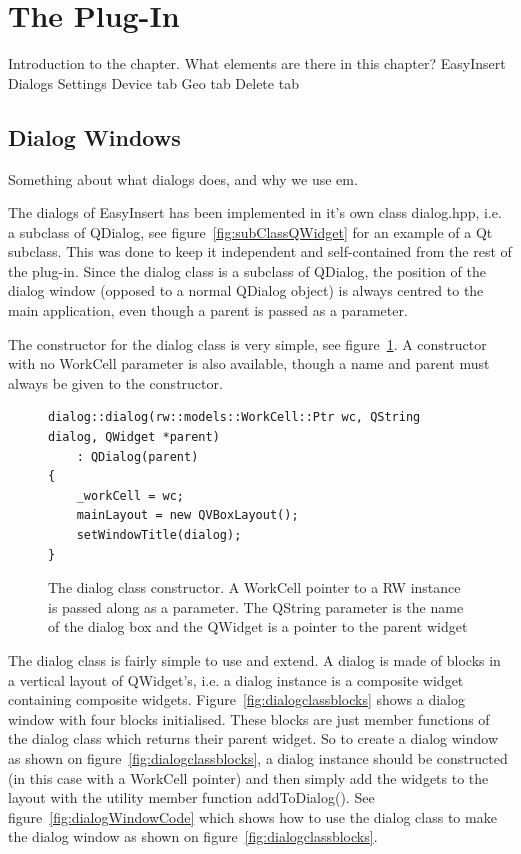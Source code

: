 \section{The Plug-In}
Introduction to the chapter.
	What elements are there in this chapter?		
		EasyInsert
		Dialogs
		Settings		
		Device tab
		Geo tab
		Delete tab


\subsection{Dialog Windows}
Something about what dialogs does, and why we use em.

The dialogs of EasyInsert has been implemented in it's own class dialog.hpp, i.e. a subclass of QDialog, see figure~\ref{fig:subClassQWidget} for an example of a Qt subclass. This was done to keep it independent and self-contained from the rest of the plug-in. Since the dialog class is a subclass of QDialog, the position of the dialog window (opposed to a normal QDialog object) is always centred to the main application, even though a parent is passed as a parameter.

The constructor for the dialog class is very simple, see figure~\ref{fig:dialogConstructor}. A constructor with no WorkCell parameter is also available, though a name and parent must always be given to the constructor. 

\begin{figure}[h]
\centering
\lstset{language=C++} 
\begin{lstlisting}[frame=single]  
dialog::dialog(rw::models::WorkCell::Ptr wc, QString dialog, QWidget *parent)
    : QDialog(parent)
{
    _workCell = wc;
    mainLayout = new QVBoxLayout();
    setWindowTitle(dialog);
}			 
\end{lstlisting}
\caption{The dialog class constructor. A WorkCell pointer to a RW instance is passed along as a parameter. The QString parameter is the name of the dialog box and the QWidget is a pointer to the parent widget }
\label{fig:dialogConstructor} 	
\end{figure}

The dialog class is fairly simple to use and extend. A dialog is made of blocks in a vertical layout of QWidget's, i.e. a dialog instance is a composite widget containing composite widgets. Figure~\ref{fig:dialogclassblocks} shows a dialog window with four blocks initialised. These blocks are just member functions of the dialog class which returns their parent widget. So to create a dialog window as shown on figure~\ref{fig:dialogclassblocks}, a dialog instance should be constructed (in this case with a WorkCell pointer) and then simply add the widgets to the layout with the utility member function addToDialog(). See figure~\ref{fig:dialogWindowCode} which shows how to use the dialog class to make the dialog window as shown on figure~\ref{fig:dialogclassblocks}. 

